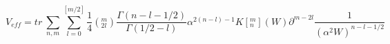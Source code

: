 \begin{equation}
V_{eff}=tr\ \sum_{n,m} \sum_{l=0}^{[m/2]} \frac{1}{4} (^m_{2l}) 
\frac{\Gamma (n-l-1/2)}{\Gamma (1/2-l)} \alpha^{2(n-l)-1} K[^m_n](W) 
\partial^{m-2l} \frac{1}{(\alpha^2 W)^{n-l-1/2}} 
\end{equation}

